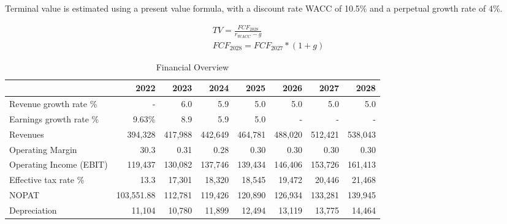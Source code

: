 Terminal value is estimated using a present value formula, with a discount rate WACC of 10.5\% and a perpetual growth rate of 4\%.

\begin{align}
    TV = \frac{FCF_{2028}}{r_{WACC}-g}\\
    FCF_{2028} = FCF_{2027}*(1+g)
\end{align}

\begin{table}[ht]
    \centering
    \caption{Financial Overview}
    \label{table:financial_overview}
    \small
    \begin{tabular}{|l|r|r|r|r|r|r|r|}
    \hline
    \textbf{}                 & \textbf{2022}     & \textbf{2023}     & \textbf{2024}     & \textbf{2025}     & \textbf{2026}     & \textbf{2027}     & \textbf{2028}     \\ \hline
    Revenue growth rate \%    & -                 & 6.0               & 5.9               & 5.0               & 5.0               & 5.0               & 5.0               \\ \hline
    Earnings growth rate \%   & 9.63\%            & 8.9               & 5.9               & 5.0               & -                 & -                 & -                 \\ \hline
    Revenues                  & 394,328           & 417,988           & 442,649           & 464,781           & 488,020           & 512,421           & 538,043           \\ \hline
    Operating Margin          & 30.3              & 0.31              & 0.28              & 0.30              & 0.30              & 0.30              & 0.30              \\ \hline
    Operating Income (EBIT)   & 119,437           & 130,082           & 137,746           & 139,434           & 146,406           & 153,726           & 161,413           \\ \hline
    Effective tax rate \%     & 13.3              & 17,301            & 18,320            & 18,545            & 19,472            & 20,446            & 21,468            \\ \hline
    NOPAT                     & 103,551.88        & 112,781           & 119,426           & 120,890           & 126,934           & 133,281           & 139,945           \\ \hline
    Depreciation              & 11,104            & 10,780            & 11,899            & 12,494            & 13,119            & 13,775            & 14,464            \\ \hline

\end{tabular}
\end{table}
